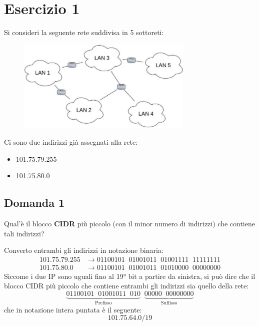 \documentclass[a4paper]{article}
\begin{document}


\tableofcontents
\pagebreak

\section{Esercizio 1}
Si consideri la seguente rete suddivisa in 5 sottoreti:
\begin{figure}[H]
  \centering
  \includegraphics[width=0.75\textwidth]{../figures/esercitazione-es1}
\end{figure}

\noindent
Ci sono due indirizzi già assegnati alla rete:
\begin{itemize}
  \item 101.75.79.255
  \item 101.75.80.0
\end{itemize}

\subsection{Domanda 1}
Qual'è il blocco \textbf{CIDR} più piccolo (con il minor numero di indirizzi) che contiene
tali indirizzi?

\vspace{1em}
\noindent
Converto entrambi gli indirizzi in notazione binaria:
\[
  \begin{aligned}
    101.75.79.255 & \to 01100101 \;\; 01001011 \;\; 01001111 \;\; 11111111 \\
    101.75.80.0   & \to 01100101 \;\; 01001011 \;\; 01010000 \;\; 00000000
  \end{aligned}
\] 
Siccome i due IP sono uguali fino al 19° bit a partire da sinistra, si può dire che
il blocco CIDR più piccolo che contiene entrambi gli indirizzi sia quello della rete:
\[
  \underbrace{01100101 \;\; 01001011 \;\; 010}_{\text{Prefisso}}
  \;\; \underbrace{00000 \;\; 00000000}_{\text{Suffisso}}
\]
che in notazione intera puntata è il seguente:
\[
   101.75.64.0/19
\] 
\end{document}
